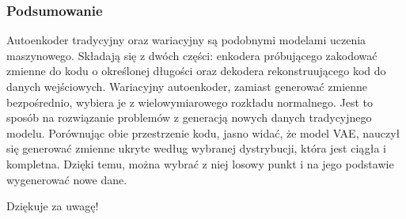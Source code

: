 \documentclass{beamer}
\begin{document}

	\begin{frame}
		\frametitle{Podsumowanie}
		Autoenkoder tradycyjny oraz wariacyjny są podobnymi modelami uczenia maszynowego. Składają się z dwóch części: enkodera próbującego zakodować zmienne do kodu o określonej długości oraz dekodera rekonstruującego kod do danych wejściowych. Wariacyjny autoenkoder, zamiast generować zmienne bezpośrednio, wybiera je z wielowymiarowego rozkładu normalnego. Jest to sposób na rozwiązanie problemów z generacją nowych danych tradycyjnego modelu. Porównując obie przestrzenie kodu, jasno widać, że model VAE, nauczył się generować zmienne ukryte według wybranej dystrybucji, która jest ciągła i kompletna. Dzięki temu, można wybrać z niej losowy punkt i na jego podstawie wygenerować nowe dane. 
	\end{frame}

	\begin{frame}
		\begin{center}
			\huge Dziękuje za uwagę!
		\end{center}
	\end{frame}
\end{document}
